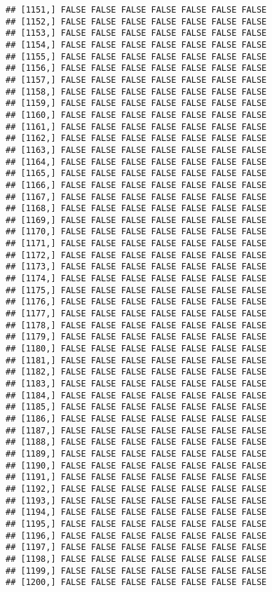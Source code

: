 \documentclass[
]{article}
\begin{document}
\begin{verbatim}
## [1151,] FALSE FALSE FALSE FALSE FALSE FALSE FALSE
## [1152,] FALSE FALSE FALSE FALSE FALSE FALSE FALSE
## [1153,] FALSE FALSE FALSE FALSE FALSE FALSE FALSE
## [1154,] FALSE FALSE FALSE FALSE FALSE FALSE FALSE
## [1155,] FALSE FALSE FALSE FALSE FALSE FALSE FALSE
## [1156,] FALSE FALSE FALSE FALSE FALSE FALSE FALSE
## [1157,] FALSE FALSE FALSE FALSE FALSE FALSE FALSE
## [1158,] FALSE FALSE FALSE FALSE FALSE FALSE FALSE
## [1159,] FALSE FALSE FALSE FALSE FALSE FALSE FALSE
## [1160,] FALSE FALSE FALSE FALSE FALSE FALSE FALSE
## [1161,] FALSE FALSE FALSE FALSE FALSE FALSE FALSE
## [1162,] FALSE FALSE FALSE FALSE FALSE FALSE FALSE
## [1163,] FALSE FALSE FALSE FALSE FALSE FALSE FALSE
## [1164,] FALSE FALSE FALSE FALSE FALSE FALSE FALSE
## [1165,] FALSE FALSE FALSE FALSE FALSE FALSE FALSE
## [1166,] FALSE FALSE FALSE FALSE FALSE FALSE FALSE
## [1167,] FALSE FALSE FALSE FALSE FALSE FALSE FALSE
## [1168,] FALSE FALSE FALSE FALSE FALSE FALSE FALSE
## [1169,] FALSE FALSE FALSE FALSE FALSE FALSE FALSE
## [1170,] FALSE FALSE FALSE FALSE FALSE FALSE FALSE
## [1171,] FALSE FALSE FALSE FALSE FALSE FALSE FALSE
## [1172,] FALSE FALSE FALSE FALSE FALSE FALSE FALSE
## [1173,] FALSE FALSE FALSE FALSE FALSE FALSE FALSE
## [1174,] FALSE FALSE FALSE FALSE FALSE FALSE FALSE
## [1175,] FALSE FALSE FALSE FALSE FALSE FALSE FALSE
## [1176,] FALSE FALSE FALSE FALSE FALSE FALSE FALSE
## [1177,] FALSE FALSE FALSE FALSE FALSE FALSE FALSE
## [1178,] FALSE FALSE FALSE FALSE FALSE FALSE FALSE
## [1179,] FALSE FALSE FALSE FALSE FALSE FALSE FALSE
## [1180,] FALSE FALSE FALSE FALSE FALSE FALSE FALSE
## [1181,] FALSE FALSE FALSE FALSE FALSE FALSE FALSE
## [1182,] FALSE FALSE FALSE FALSE FALSE FALSE FALSE
## [1183,] FALSE FALSE FALSE FALSE FALSE FALSE FALSE
## [1184,] FALSE FALSE FALSE FALSE FALSE FALSE FALSE
## [1185,] FALSE FALSE FALSE FALSE FALSE FALSE FALSE
## [1186,] FALSE FALSE FALSE FALSE FALSE FALSE FALSE
## [1187,] FALSE FALSE FALSE FALSE FALSE FALSE FALSE
## [1188,] FALSE FALSE FALSE FALSE FALSE FALSE FALSE
## [1189,] FALSE FALSE FALSE FALSE FALSE FALSE FALSE
## [1190,] FALSE FALSE FALSE FALSE FALSE FALSE FALSE
## [1191,] FALSE FALSE FALSE FALSE FALSE FALSE FALSE
## [1192,] FALSE FALSE FALSE FALSE FALSE FALSE FALSE
## [1193,] FALSE FALSE FALSE FALSE FALSE FALSE FALSE
## [1194,] FALSE FALSE FALSE FALSE FALSE FALSE FALSE
## [1195,] FALSE FALSE FALSE FALSE FALSE FALSE FALSE
## [1196,] FALSE FALSE FALSE FALSE FALSE FALSE FALSE
## [1197,] FALSE FALSE FALSE FALSE FALSE FALSE FALSE
## [1198,] FALSE FALSE FALSE FALSE FALSE FALSE FALSE
## [1199,] FALSE FALSE FALSE FALSE FALSE FALSE FALSE
## [1200,] FALSE FALSE FALSE FALSE FALSE FALSE FALSE

\end{verbatim}
\end{document}
